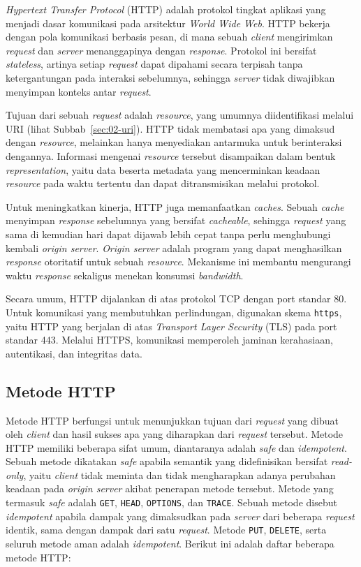 \textit{Hypertext Transfer Protocol} (HTTP) adalah protokol tingkat aplikasi yang menjadi dasar komunikasi pada arsitektur \textit{World Wide Web}. HTTP bekerja dengan pola komunikasi berbasis pesan, di mana sebuah \textit{client} mengirimkan \textit{request} dan \textit{server} menanggapinya dengan \textit{response}. Protokol ini bersifat \textit{stateless}, artinya setiap \textit{request} dapat dipahami secara terpisah tanpa ketergantungan pada interaksi sebelumnya, sehingga \textit{server} tidak diwajibkan menyimpan konteks antar \textit{request}. 

Tujuan dari sebuah \textit{request} adalah \textit{resource}, yang umumnya diidentifikasi melalui URI (lihat Subbab~\ref{sec:02-uri}). HTTP tidak membatasi apa yang dimaksud dengan \textit{resource}, melainkan hanya menyediakan antarmuka untuk berinteraksi dengannya. Informasi mengenai \textit{resource} tersebut disampaikan dalam bentuk \textit{representation}, yaitu data beserta metadata yang mencerminkan keadaan \textit{resource} pada waktu tertentu dan dapat ditransmisikan melalui protokol.

Untuk meningkatkan kinerja, HTTP juga memanfaatkan \textit{caches}. Sebuah \textit{cache} menyimpan \textit{response} sebelumnya yang bersifat \textit{cacheable}, sehingga \textit{request} yang sama di kemudian hari dapat dijawab lebih cepat tanpa perlu menghubungi kembali \textit{origin server}. \textit{Origin server} adalah program yang dapat menghasilkan \textit{response} otoritatif untuk sebuah \textit{resource}. Mekanisme ini membantu mengurangi waktu \textit{response} sekaligus menekan konsumsi \textit{bandwidth}.

Secara umum, HTTP dijalankan di atas protokol TCP dengan port standar 80. Untuk komunikasi yang membutuhkan perlindungan, digunakan skema \texttt{https}, yaitu HTTP yang berjalan di atas \textit{Transport Layer Security} (TLS) pada port standar 443. Melalui HTTPS, komunikasi memperoleh jaminan kerahasiaan, autentikasi, dan integritas data.


\subsection{Metode HTTP}
\label{subsec:0201-metode-http}

Metode HTTP berfungsi untuk menunjukkan tujuan dari \textit{request} yang dibuat oleh \textit{client} dan hasil sukses apa yang diharapkan dari \textit{request} tersebut. Metode HTTP memiliki beberapa sifat umum, diantaranya adalah \textit{safe} dan \textit{idempotent}. Sebuah metode dikatakan \textit{safe} apabila semantik yang didefinisikan bersifat \textit{read-only}, yaitu \textit{client} tidak meminta dan tidak mengharapkan adanya perubahan keadaan pada \textit{origin server} akibat penerapan metode tersebut. Metode yang termasuk \textit{safe} adalah \texttt{GET}, \texttt{HEAD}, \texttt{OPTIONS}, dan \texttt{TRACE}. Sebuah metode disebut \textit{idempotent} apabila dampak yang dimaksudkan pada \textit{server} dari beberapa \textit{request} identik, sama dengan dampak dari satu \textit{request}. Metode \texttt{PUT}, \texttt{DELETE}, serta seluruh metode aman adalah \textit{idempotent}. Berikut ini adalah daftar beberapa metode HTTP:


